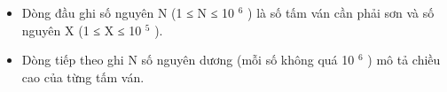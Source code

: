 \begin{itemize}
	\item     Dòng đầu ghi số nguyên N (1 ≤ N ≤ 10    $^     6    $    ) là số tấm ván cần phải sơn và số nguyên X (1 ≤ X ≤ 10    $^     5    $    ).   
	\item     Dòng tiếp theo ghi N số nguyên dương (mỗi số không quá 10    $^     6    $    ) mô tả chiều cao của từng tấm ván.   
\end{itemize}